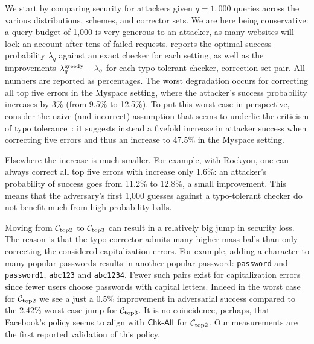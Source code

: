 We start by comparing security for attackers given $q = 1,000$ queries across
the various distributions, schemes, and corrector sets. We are here being
conservative: a query budget
of 1,000 is very generous to an attacker, as many websites will lock an account
after tens of failed requests.   reports the
optimal success probability $\lambda_q$ against an exact checker for each
setting, as well as the improvements $\lambda^\textnormal{greedy}_q - \lambda_q$ for each typo
tolerant checker, correction set pair.  All numbers are reported as percentages.
The worst degradation occurs for correcting all top five errors in the Myspace setting, 
where the attacker's success probability increases by 3\% (from 9.5\% to 12.5\%).  To put this worst-case 
in perspective, consider the naive
(and incorrect) assumption that seems to underlie the criticism of typo
tolerance~\cite{zdnet2011Facebook}: it suggests
instead a fivefold increase in attacker success when correcting five
errors and thus an increase to 47.5\% in the Myspace setting.




Elsewhere the increase is much smaller. For example, with
Rockyou, one can always correct all top five errors with increase only 1.6\%: an
attacker's probability of success goes from 11.2\% to 12.8\%, a small
improvement. This means that the adversary's first 1,000 guesses
against a typo-tolerant checker do not benefit much from
high-probability balls.  

Moving from ${\mathcal C}_{\textrm{top2}}$ to ${\mathcal C}_{\textrm{top3}}$ can result in a relatively big jump in security loss. The reason is that
the \rmlast typo corrector admits many higher-mass balls than only
correcting the considered capitalization errors. For example, adding a character to many popular
passwords results in another popular password: \texttt{password} and \texttt{password1}, \texttt{abc123} and
\texttt{abc1234}. Fewer such pairs exist for capitalization errors since
fewer users choose passwords with capital letters. Indeed in the worst case for
${\mathcal C}_{\textrm{top2}}$ we see a just a 0.5\% improvement in adversarial success compared to
the 2.42\% worst-case jump for ${\mathcal C}_{\textrm{top3}}$. It is no
coincidence, perhaps, that Facebook's policy seems to align with $\textnormal{\textsf{Chk-All}}$
for ${\mathcal C}_{\textrm{top2}}$. Our measurements are the first reported validation of
this policy.

